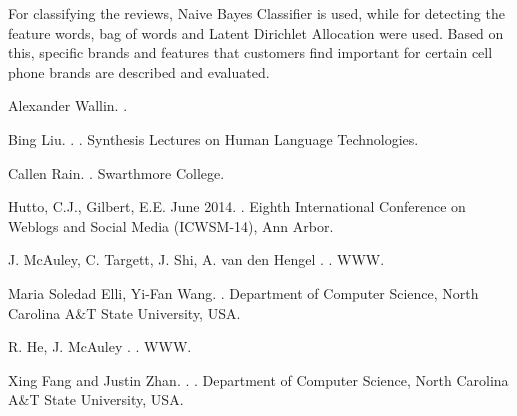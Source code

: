 \documentclass[11pt]{article}
\begin{document}
  For classifying the reviews, Naive Bayes Classifier is used, while for detecting the feature words, bag of words and Latent Dirichlet Allocation were used. Based on this, specific brands and features that customers find important for certain cell phone brands are described and evaluated.  
  
 
  
  \begin{thebibliography}{}
  
  Alexander Wallin.
  .
  
  
  Bing Liu.
  .
  .
  \newblock Synthesis Lectures on Human Language Technologies.
  
  
  Callen Rain.
  .
  \newblock Swarthmore College.


  Hutto, C.J., Gilbert, E.E.
  \newblock June 2014.
  .
  \newblock Eighth International Conference on Weblogs and Social Media (ICWSM-14), Ann Arbor.


  J. McAuley, C. Targett, J. Shi, A. van den Hengel
  .
  .
  \newblock WWW.
  
  
  Maria Soledad Elli, Yi-Fan Wang.
  .
  \newblock Department of Computer Science, North Carolina A\&T State University, USA.


  R. He, J. McAuley
  .
  .
  \newblock WWW.

  
  Xing Fang and Justin Zhan.
  .
  .
  \newblock Department of Computer Science, North Carolina A\&T State University, USA.
  

  
  

  
  
  
  \end{thebibliography}


  
\end{document}
